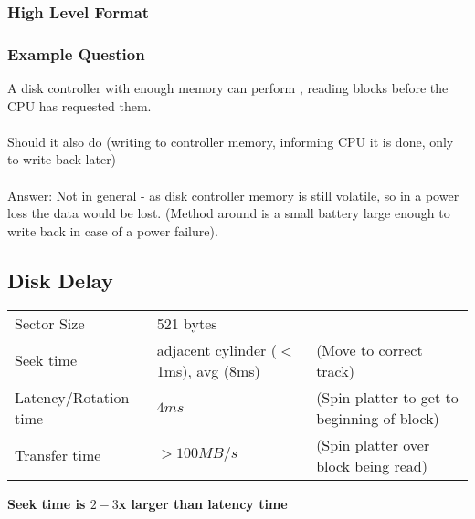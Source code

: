 \documentclass{report}
\begin{document}
            \subsubsection*{High Level Format}
            
            \subsubsection*{Example Question}
                A disk controller with enough memory can perform , reading blocks before the CPU has requested them.
                \\ 
                \\ Should it also do  (writing to controller memory, informing CPU it is done, only to write back later)
                \\
                \\ Answer: Not in general - as disk controller memory is still volatile, so in a power loss the data would be lost. (Method around is a small battery large enough to write back in case of a power failure).
        
        \subsection*{Disk Delay}
            \begin{center}
                \begin{tabular}{l l l}
                    Sector Size & 521 bytes & \\
                    Seek time & adjacent cylinder ($<$1ms), avg (8ms)& (Move to correct track) \\
                    Latency/Rotation time & $4ms$ & (Spin platter to get to beginning of block) \\
                    Transfer time & $> 100MB/s$ & (Spin platter over block being read) \\
                \end{tabular}
            \end{center}
            \textbf{Seek time is $2-3$x larger than latency time}
\end{document}
